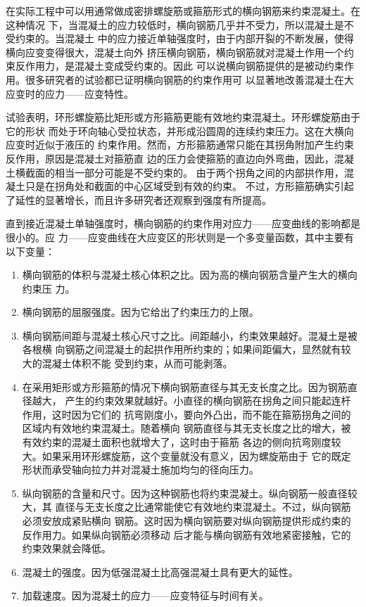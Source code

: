 \documentclass[12pt,a4paper]{book}
\begin{document}
在实际工程中可以用通常做成密排螺旋筋或箍筋形式的横向钢筋来约束混凝土。在这种情况
下，当混凝土的应力较低时，横向钢筋几乎并不受力，所以混凝土是不受约束的。当混凝土
中的应力接近单轴强度时，由于内部开裂的不断发展，使得横向应变变得很大，混凝土向外
挤压横向钢筋，横向钢筋就对混凝土作用一个约束反作用力，是混凝土变成受约束的。因此
可以说横向钢筋提供的是被动约束作用。很多研究者的试验都已证明横向钢筋的约束作用可
以显著地改善混凝土在大应变时的应力——应变特性。

试验表明，环形螺旋筋比矩形或方形箍筋更能有效地约束混凝土。环形螺旋筋由于它的形状
而处于环向轴心受拉状态，并形成沿圆周的连续约束压力。这在大横向应变时近似于液压的
约束作用。然而，方形箍筋通常只能在其拐角附加产生约束反作用，原因是混凝土对箍筋直
边的压力会使箍筋的直边向外弯曲，因此，混凝土横截面的相当一部分可能是不受约束的。
由于两个拐角之间的内部拱作用，混凝土只是在拐角处和截面的中心区域受到有效的约束。
不过，方形箍筋确实引起了延性的显著增长，而且许多研究者还观察到强度有所提高。

直到接近混凝土单轴强度时，横向钢筋的约束作用对应力——应变曲线的影响都是很小的。应
力——应变曲线在大应变区的形状则是一个多变量函数，其中主要有以下变量：
\begin{enumerate}
\item 横向钢筋的体积与混凝土核心体积之比。因为高的横向钢筋含量产生大的横向约束压
  力。
\item 横向钢筋的屈服强度。因为它给出了约束压力的上限。
\item 横向钢筋间距与混凝土核心尺寸之比。间距越小，约束效果越好。混凝土是被各根横
  向钢筋之间混凝土的起拱作用所约束的；如果间距偏大，显然就有较大的混凝土体积不能
  受到约束，从而可能剥落。
\item 在采用矩形或方形箍筋的情况下横向钢筋直径与其无支长度之比。因为钢筋直径越大，
  产生的约束效果就越好。小直径的横向钢筋在拐角之间只能起连杆作用，这时因为它们的
  抗弯刚度小，要向外凸出，而不能在箍筋拐角之间的区域内有效地约束混凝土。随着横向
  钢筋直径与其无支长度之比的增大，被有效约束的混凝土面积也就增大了，这时由于箍筋
  各边的侧向抗弯刚度较大。如果采用环形螺旋筋，这个变量就没有意义，因为螺旋筋由于
  它的既定形状而承受轴向拉力并对混凝土施加均匀的径向压力。
\item 纵向钢筋的含量和尺寸。因为这种钢筋也将约束混凝土。纵向钢筋一般直径较大，其
  直径与无支长度之比通常能使它有效地约束混凝土。不过，纵向钢筋必须安放成紧贴横向
  钢筋。这时因为横向钢筋要对纵向钢筋提供形成约束的反作用力。如果纵向钢筋必须移动
  后才能与横向钢筋有效地紧密接触，它的约束效果就会降低。
\item 混凝土的强度。因为低强混凝土比高强混凝土具有更大的延性。
\item 加载速度。因为混凝土的应力——应变特征与时间有关。
\end{enumerate}
\end{document}
